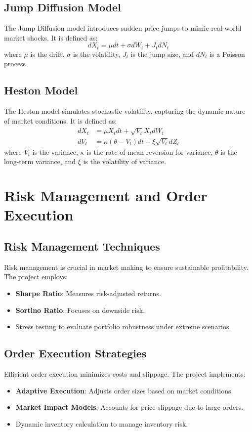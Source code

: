 \documentclass{beamer}
\begin{document}
\subsection{Jump Diffusion Model}
The Jump Diffusion model introduces sudden price jumps to mimic real-world market shocks. It is defined as:
\begin{equation}
    dX_t = \mu dt + \sigma dW_t + J_t dN_t
\end{equation}
where $\mu$ is the drift, $\sigma$ is the volatility, $J_t$ is the jump size, and $dN_t$ is a Poisson process.

\subsection{Heston Model}
The Heston model simulates stochastic volatility, capturing the dynamic nature of market conditions. It is defined as:
\begin{align}
    dX_t &= \mu X_t dt + \sqrt{V_t} X_t dW_t \\
    dV_t &= \kappa(\theta - V_t)dt + \xi \sqrt{V_t} dZ_t
\end{align}
where $V_t$ is the variance, $\kappa$ is the rate of mean reversion for variance, $\theta$ is the long-term variance, and $\xi$ is the volatility of variance.

\section{Risk Management and Order Execution}
\subsection{Risk Management Techniques}
Risk management is crucial in market making to ensure sustainable profitability. The project employs:
\begin{itemize}
    \item \textbf{Sharpe Ratio}: Measures risk-adjusted returns.
    \item \textbf{Sortino Ratio}: Focuses on downside risk.
    \item Stress testing to evaluate portfolio robustness under extreme scenarios.
\end{itemize}

\subsection{Order Execution Strategies}
Efficient order execution minimizes costs and slippage. The project implements:
\begin{itemize}
    \item \textbf{Adaptive Execution}: Adjusts order sizes based on market conditions.
    \item \textbf{Market Impact Models}: Accounts for price slippage due to large orders.
    \item Dynamic inventory calculation to manage inventory risk.
\end{itemize}
\end{document}
